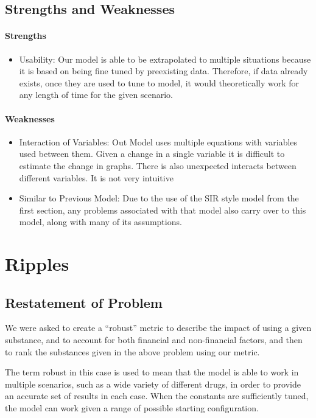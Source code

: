 \documentclass[12pt,letterpaper]{article}
\begin{document}
\subsection{Strengths and Weaknesses}
\paragraph{Strengths}
\begin{itemize}
\item Usability: Our model is able to be extrapolated to multiple situations because it is based on being fine tuned by preexisting data. Therefore, if data already exists, once they are used to tune to model, it would theoretically work for any length of time for the given scenario.
\end{itemize}

\paragraph{Weaknesses}
\begin{itemize}
\item Interaction of Variables: Out Model uses multiple equations with variables used between them. Given a change in a single variable it is difficult to estimate the change in graphs. There is also unexpected interacts between different variables. It is not very intuitive
\item Similar to Previous Model: Due to the use of the SIR style model from the first section, any problems associated with that model also carry over to this model, along with many of its assumptions. 
\end{itemize}

\section{Ripples}
\subsection{Restatement of Problem}
We were asked to create a “robust” metric to describe the impact of using a given substance, and to account for both financial and non-financial factors, and then to rank the substances given in the above problem using our metric.

The term robust in this case is used to mean that the model is able to work in multiple scenarios, such as a wide variety of different drugs, in order to provide an accurate set of results in each case. When the constants are sufficiently tuned, the model can work given a range of possible starting configuration.
\end{document}
